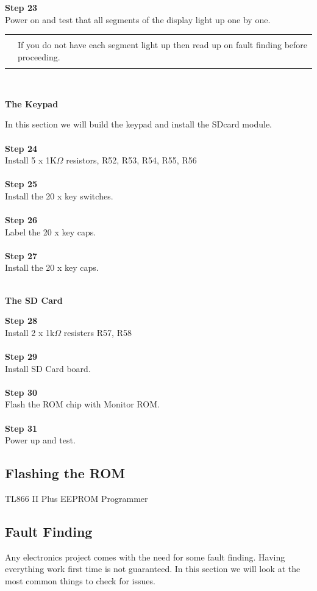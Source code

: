 \documentclass{ol-softwaremanual}
\newcommand{\Note}[1]{
\begin{table}[h]
\begin{tabular}{|p{0.1\textwidth}p{0.8\textwidth}|}
\hline
 & \\
\multicolumn{1}{|r}{\Huge\warning} & #1\\
 &  \\ \hline
\end{tabular}
\end{table}
}
\begin{document}
\begin{ffcode}
\textbf{Step 23}\\
Power on and test that all segments of the display light up one by one.
\\
\Note{If you do not have each segment light up then read up on fault finding before proceeding.}
\\
\pagebreak
\begin{center}
\textbf{The Keypad}
\end{center}
In this section we will build the keypad and install the SDcard module.\\
\\
\textbf{Step 24}\\
Install  5 x 1K$\Omega$ resistors, R52, R53, R54, R55, R56\\
\\
\textbf{Step 25}\\
Install the 20 x key switches.\\
\\
\textbf{Step 26}\\
Label the 20 x key caps.\\
\\
\textbf{Step 27}\\
Install the 20 x key caps.\\
\\
\begin{center}
\textbf{The SD Card}
\end{center}
\textbf{Step 28}\\
Install 2 x 1k$\Omega$ resisters R57, R58\\
\\
\textbf{Step 29}\\
Install SD Card board.\\
\\
\textbf{Step 30}\\
Flash the ROM chip with Monitor ROM.\\
\\
\textbf{Step 31}\\
Power up and test.\\

\pagebreak
\subsection{Flashing the ROM}
TL866 II Plus EEPROM Programmer


\pagebreak

\subsection{Fault Finding}
Any electronics project comes with the need for some fault finding. Having everything work first time is not guaranteed. In this section we will look at the most common things to check for issues.


\end{ffcode}
\end{document}
